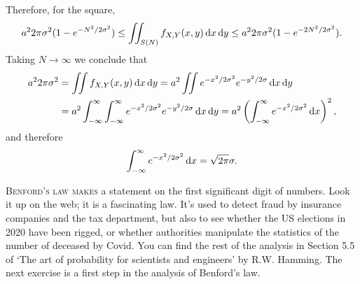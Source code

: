 \begin{exercise}
\begin{solution}
Therefore, for the square,
\begin{equation}
a^{2}2\pi{\sigma^{2}} (1-e^{-N^{2}/2\sigma^{2}}) \leq
  \iint_{S(N)}f_{X,Y}(x,y) \,\textrm{d}x\,\textrm{d}y \leq
a^{2}2\pi{\sigma^{2}} (1-e^{-2N^{2}/2\sigma^{2}}).
\end{equation}
Taking $N\to\infty$ we conclude that
\begin{align}
a^{2}2\pi{\sigma^{2}}
&=\iint f_{X,Y}(x,y) \,\textrm{d}x\,\textrm{d}y
=a^{2}  \iint e^{-x^{2}/2\sigma^{2}} e^{-y^{2}/2\sigma} \,\textrm{d}x\,\textrm{d}y\\
&=a^{2}  \int_{-\infty}^{\infty} \int_{-\infty}^{\infty }e^{-x^{2}/2\sigma^{2}} e^{-y^{2}/2\sigma} \,\textrm{d}x\,\textrm{d}y
=a^{2} \left( \int_{-\infty}^{\infty }e^{-x^{2}/2\sigma^{2}} \,\textrm{d}x\right)^{2},
\end{align}
and therefore
\begin{equation}
\label{eq:18}
\int_{-\infty}^{\infty }e^{-x^{2}/2\sigma^{2}} \,\textrm{d}x = \sqrt{2 \pi}\sigma.
\end{equation}
\end{solution}
\end{exercise}


\textsc{Benford's law makes} a statement on the first significant digit of numbers.
Look it up on the web; it is a fascinating law.
It's used to detect fraud by insurance companies and the tax department, but also to see whether the US elections in 2020 have been rigged, or whether authorities manipulate the statistics of the number of deceased by Covid.
You can find the rest of the analysis in Section 5.5 of `The art of probability for scientists and engineers' by R.W.
Hamming. The next exercise is a first step in the analysis of Benford's law.

